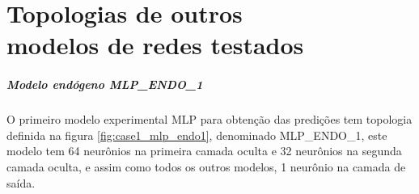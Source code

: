 \chapter{Topologias de outros \\ modelos de redes testados}\label{cap:anexo1}
	
	\paragraph{Modelo endógeno MLP\_ENDO\_1}
        O primeiro modelo experimental MLP para obtenção das predições tem topologia definida na figura \ref{fig:case1_mlp_endo1}, denominado MLP\_ENDO\_1, este modelo tem 64 neurônios na primeira camada oculta e 32 neurônios na segunda camada oculta, e assim como todos os outros modelos, 1 neurônio na camada de saída.    
        
        \begin{figure}[h]
        \end{figure}
            
